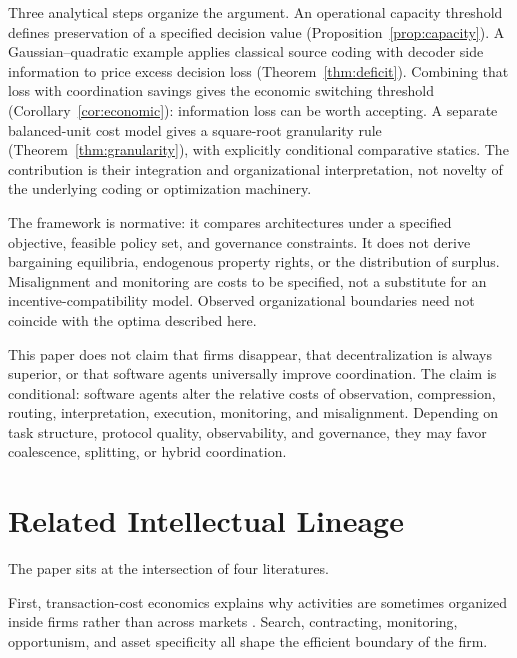 \documentclass[11pt]{article}
\begin{document}
Three analytical steps organize the argument. An operational capacity
threshold defines preservation of a specified decision value
(Proposition~\ref{prop:capacity}). A Gaussian--quadratic example applies
classical source coding with decoder side information to price excess decision
loss (Theorem~\ref{thm:deficit}). Combining that loss with coordination
savings gives the economic switching threshold
(Corollary~\ref{cor:economic}): information loss can be worth accepting.
A separate balanced-unit cost model gives a square-root granularity rule
(Theorem~\ref{thm:granularity}), with explicitly conditional comparative
statics. The contribution is their integration and organizational
interpretation, not novelty of the underlying coding or optimization machinery.

The framework is normative: it compares architectures under a specified
objective, feasible policy set, and governance constraints. It does not derive
bargaining equilibria, endogenous property rights, or the distribution of
surplus. Misalignment and monitoring are costs to be specified, not a
substitute for an incentive-compatibility model. Observed organizational
boundaries need not coincide with the optima described here.

This paper does not claim that firms disappear, that decentralization is always
superior, or that software agents universally improve coordination. The claim
is conditional: software agents alter the relative costs of observation,
compression, routing, interpretation, execution, monitoring, and misalignment.
Depending on task structure, protocol quality, observability, and governance,
they may favor coalescence, splitting, or hybrid coordination.

\section{Related Intellectual Lineage}

The paper sits at the intersection of four literatures.

First, transaction-cost economics explains why activities are sometimes
organized inside firms rather than across markets \cite{coase1937,
williamson1985}. Search, contracting, monitoring, opportunism, and asset
specificity all shape the efficient boundary of the firm.
\end{document}

